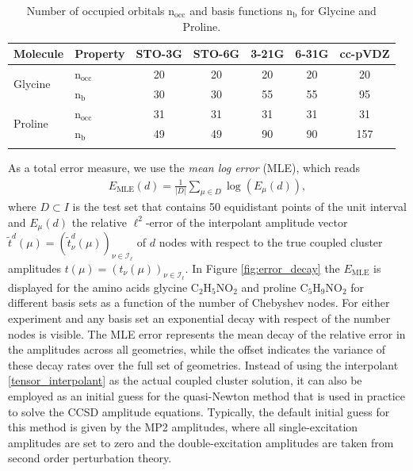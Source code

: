 \documentclass[reqno]{amsart}
\begin{document}
 
\begin{table}[htpb]
    \centering
    \caption{Number of occupied orbitals $\text{n}_{\text{occ}}$ and basis functions $\text{n}_{\text{b}}$ for Glycine and Proline.}
    \begin{tabular}{llccccc}
        \toprule
        \textbf{Molecule} & \textbf{Property} & \textbf{STO-3G} & \textbf{STO-6G} & \textbf{3-21G} & \textbf{6-31G} & \textbf{cc-pVDZ} \\
        \midrule
        \multirow{2}{*}{Glycine} 
        & $\text{n}_{\text{occ}}$ & 20 & 20 & 20 & 20 & 20 \\
        & $\text{n}_{\text{b}}$     & 30 & 30 & 55 & 55 & 95 \\
        \midrule
        \multirow{2}{*}{Proline} 
        & $\text{n}_{\text{occ}}$ & 31 & 31 & 31 & 31 & 31 \\
        & $\text{n}_{\text{b}}$     & 49 & 49 & 90 & 90 & 157 \\
        \bottomrule
        \multicolumn{7}{l}{\footnotesize }
    \end{tabular}
\end{table}
As a total error measure, we use the \textit{mean log error} (MLE), which reads
\begin{align}\label{error_metric}
    E_{\text{MLE}}(d)=\frac{1}{|D|}\sum_{\mu \in D}\log(E_\mu(d)),
\end{align}
where $D\subset I$ is the test set that contains 50 equidistant points of the unit interval and $E_\mu(d)$ the relative $\ell^2$-error of the interpolant amplitude vector $\tilde{t}^d(\mu)=(\tilde{t}^d_\nu(\mu))_{\nu\in \mathscr{I}_\ell}$ of $d$ nodes with respect to the true coupled cluster amplitudes $t(\mu)=(t_\nu(\mu))_{\nu\in \mathscr{I}_\ell}$.
In Figure \ref{fig:error_decay} the $E_{\text{MLE}}$ is displayed for the amino acids glycine $\mathrm{C}_2\mathrm{H}_5\mathrm{N}\mathrm{O}_2$ and proline $\mathrm{C}_5\mathrm{H}_9\mathrm{N}\mathrm{O}_2$ for different basis sets as a function of the number of Chebyshev nodes. For either experiment and any basis set an exponential decay with respect of the number nodes is visible. The MLE error represents the mean decay of the relative error in the amplitudes across all geometries, while the offset indicates the variance of these decay rates over the full set of geometries.  Instead of using the interpolant \eqref{tensor_interpolant} as the actual coupled cluster solution, it can also be employed as an initial guess for the quasi-Newton method that is used in practice to solve the CCSD amplitude equations. Typically, the default initial guess for this method is given by the MP2 amplitudes, where all single-excitation amplitudes are set to zero and the double-excitation amplitudes are taken from second order perturbation theory. 
\end{document}
